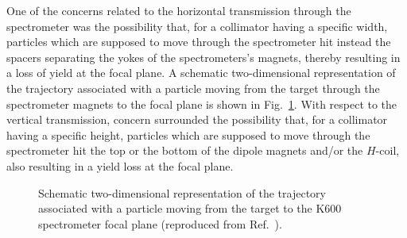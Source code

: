 \documentclass[11pt]{report}
\begin{document}
\bigskip



One of the concerns related to the horizontal transmission 
through the spectrometer was the possibility that, for a collimator 
having a specific width,  
particles which are supposed to move through the spectrometer
hit instead the spacers
separating the yokes of the spectrometers's magnets, 
thereby resulting in a loss of yield at the 
focal plane.
A schematic two-dimensional 
representation of the trajectory 
associated with a particle
moving from the target through the  spectrometer 
magnets to the  focal plane
is shown in Fig.~\ref{fig:vertical-acceptance}.
With respect to the vertical transmission,
concern surrounded the possibility that, for a collimator 
having a specific height,  
particles which are supposed to move through the spectrometer
hit the top or the bottom of the dipole magnets
and/or the $H$-coil, also resulting in a yield loss at the focal plane.




\begin{figure}
\centerline{\vspace{0cm}\hspace{0cm}
}
\centering
\caption{Schematic two-dimensional 
representation of the trajectory associated with a particle
 moving from the target to the K600 spectrometer focal plane
(reproduced from Ref.~\cite{Sch86}).}
\label{fig:vertical-acceptance}
\end{figure} 
\end{document}
